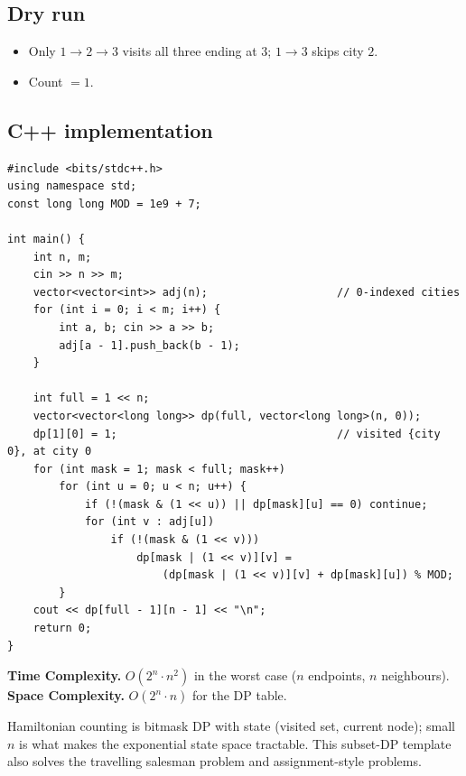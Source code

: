 \subsection*{Dry run}


\begin{itemize}
  \item Only $1\to2\to3$ visits all three ending at $3$; $1\to3$ skips
        city $2$.
  \item Count $=1$.
\end{itemize}

\subsection*{C++ implementation}

\begin{lstlisting}
#include <bits/stdc++.h>
using namespace std;
const long long MOD = 1e9 + 7;

int main() {
    int n, m;
    cin >> n >> m;
    vector<vector<int>> adj(n);                    // 0-indexed cities
    for (int i = 0; i < m; i++) {
        int a, b; cin >> a >> b;
        adj[a - 1].push_back(b - 1);
    }

    int full = 1 << n;
    vector<vector<long long>> dp(full, vector<long long>(n, 0));
    dp[1][0] = 1;                                  // visited {city 0}, at city 0
    for (int mask = 1; mask < full; mask++)
        for (int u = 0; u < n; u++) {
            if (!(mask & (1 << u)) || dp[mask][u] == 0) continue;
            for (int v : adj[u])
                if (!(mask & (1 << v)))
                    dp[mask | (1 << v)][v] =
                        (dp[mask | (1 << v)][v] + dp[mask][u]) % MOD;
        }
    cout << dp[full - 1][n - 1] << "\n";
    return 0;
}
\end{lstlisting}

\begin{complexitybox}
\textbf{Time Complexity.} $O(2^n\cdot n^2)$ in the worst case ($n$ endpoints,
$n$ neighbours). \textbf{Space Complexity.} $O(2^n\cdot n)$ for the DP table.
\end{complexitybox}

\begin{takeawaybox}
Hamiltonian counting is bitmask DP with state (visited set, current node);
small $n$ is what makes the exponential state space tractable. This
subset-DP template also solves the travelling salesman problem and
assignment-style problems.
\end{takeawaybox}
